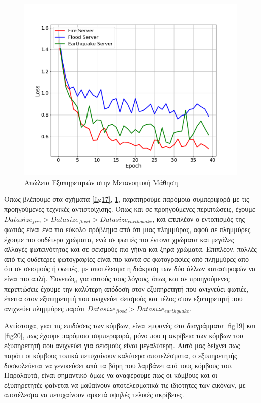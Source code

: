 \begin{figure}[ht]
    \centering
    \includegraphics[width=\textwidth]{figures/chapter4/Server_Losses.png}
    \caption{Απώλεια Εξυπηρετητών στην Μετανοητική Μάθηση}
    \label{fig18}
\end{figure}

Όπως βλέπουμε στα σχήματα \ref{fig17}, \ref{fig18}, παρατηρούμε παρόμοια συμπεριφορά με τις προηγούμενες τεχνικές αντιστοίχισης. Όπως και σε προηγούμενες περιπτώσεις, έχουμε $Datasize_{fire} > Datasize_{flood} >Datasize_{earthquake}$, και επιπλέον ο εντοπισμός της φωτιάς είναι ένα πιο εύκολο πρόβλημα από ότι μιας πλημμύρας, αφού σε πλημμύρες έχουμε πιο ουδέτερα χρώματα, ενώ σε φωτιές πιο έντονα χρώματα και μεγάλες αλλαγές φωτεινότητας και σε σεισμούς πιο γήινα και ξηρά χρώματα. Επιπλέον, πολλές από τις ουδέτερες φωτογραφίες είναι πιο κοντά σε φωτογραφίες από πλημμύρες από ότι σε σεισμούς ή φωτιές, με αποτέλεσμα η διάκριση των δύο άλλων καταστροφών να είναι πιο απλή. Συνεπώς, για αυτούς τους λόγους, όπως και σε προηγούμενες περιπτώσεις έχουμε την καλύτερη απόδοση στον εξυπηρετητή που ανιχνεύει φωτιές, έπειτα στον εξυπηρετητή που ανιχνεύει σεισμούς και τέλος στον εξυπηρετητή που ανιχνεύει πλημμύρες παρότι $Datasize_{flood} >Datasize_{earthquake}$. 

Αντίστοιχα, γιατ τις επιδόσεις των κόμβων, είναι εμφανές στα διαγράμματα \ref*{fig19} και \ref*{fig20}, πως έχουμε παρόμοια συμπεριφορά, μόνο που η ακρίβεια των κόμβων του εξυπηρετητή που ανιχνεύει για σεισμούς είναι μεγαλύτερη. Αυτό μας δείχνει πως παρότι οι κόμβους τοπικά πετυχαίνουν καλύτερα αποτελέσματα, ο εξυπηρετητής δυσκολεύεται να γενικεύσει από τα βάρη που λαμβάνει από τους κόμβους του. Παρολαυτά, είναι σημαντικό όμως να αναφέρουμε πως οι κόμβους και οι εξυπηρετητές φαίνεται να μαθαίνουν αποτελεσματικά τις ιδιότητες των εικόνων, με αποτέλεσμα να πετυχαίνουν αρκετά υψηλές τελικές ακρίβειες. 

